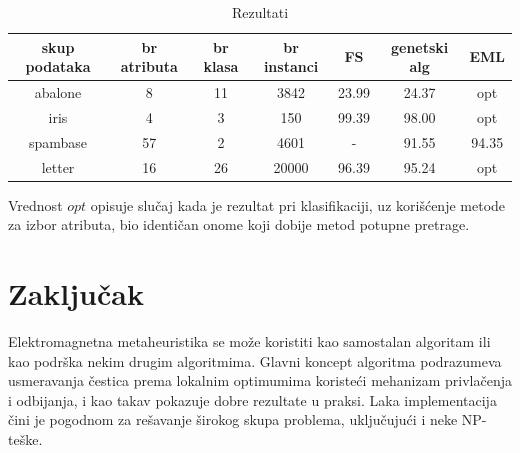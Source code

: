 \documentclass[a4paper]{article}
\begin{document}
\begin{table}[h]
\caption{Rezultati} \label{tabela}
\centering
\begin{center}
\small\addtolength{\tabcolsep}{-3pt}
\begin{tabular}{||c c c c c c C||}

\hline
skup podataka & br atributa & br klasa & br instanci & FS & genetski alg & EML \\ [0.1ex] 
\hline\hline
abalone & 8 & 11 & 3842 & 23.99 & 24.37 & opt \\ 
\hline
iris & 4 & 3 & 150 & 99.39 & 98.00 & opt \\
\hline
spambase & 57 & 2 & 4601 & - & 91.55 & 94.35\\
\hline
letter & 16 & 26 & 20000 & 96.39 & 95.24 & opt\\
\hline
\end{tabular}
\end{center}
\end{table}
Vrednost $opt$ opisuje slučaj kada je rezultat pri klasifikaciji, uz korišćenje metode za izbor atributa, bio identičan onome koji dobije metod potupne pretrage. 


\section{Zaključak}
\label{sec:zakljucak}

Elektromagnetna metaheuristika se može koristiti kao samostalan algoritam ili kao podrška nekim drugim algoritmima. Glavni koncept algoritma podrazumeva usmeravanja čestica prema lokalnim optimumima koristeći mehanizam privlačenja i odbijanja, i kao takav pokazuje dobre rezultate u praksi. Laka implementacija čini je pogodnom za rešavanje širokog skupa problema, uključujući i neke NP-teške.


\end{document}
